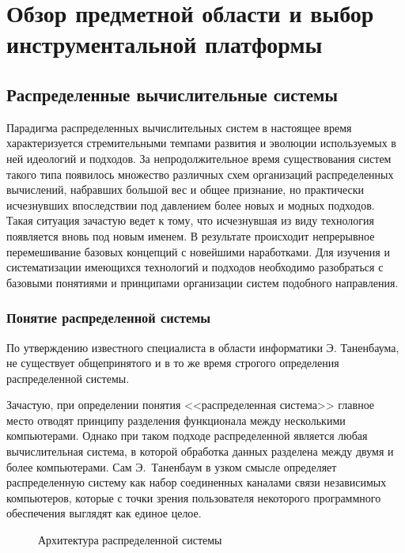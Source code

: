 \updateStamp
{}
\section{Обзор предметной области и выбор инструментальной платформы}
\subsection{Распределенные вычислительные системы}

Парадигма распределенных вычислительных систем в настоящее время характеризуется стремительными темпами развития и эволюции используемых в ней идеологий и подходов. За непродолжительное время существования систем такого типа появилось множество различных схем организаций распределенных вычислений, набравших большой вес и общее признание, но практически исчезнувших впоследствии под давлением более новых и модных подходов. Такая ситуация зачастую ведет к тому, что исчезнувшая из виду технология появляется вновь под новым именем. В результате происходит непрерывное перемешивание базовых концепций с новейшими наработками. Для изучения и систематизации имеющихся технологий и подходов необходимо разобраться с базовыми понятиями и принципами организации систем подобного направления. 

\subsubsection{Понятие распределенной системы}
По утверждению известного специалиста в области информатики Э. Таненбаума, не существует общепринятого и в то же время строгого определения распределенной системы. 

Зачастую, при определении понятия <<распределенная система>> главное место отводят принципу разделения функционала между несколькими компьютерами. Однако при таком подходе распределенной является любая вычислительная система, в которой обработка данных разделена между двумя и более компьютерами. Сам Э.~Таненбаум в узком смысле определяет распределенную систему как набор соединенных каналами связи независимых компьютеров, которые с точки зрения пользователя некоторого программного обеспечения выглядят как единое целое.

\begin{figure}[h]
\caption{Архитектура распределенной системы}
\label{0:dcs}
\end{figure}

